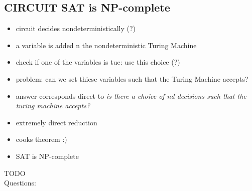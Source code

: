 \documentclass[a4]{scrartcl}
\begin{document}
\subsection*{\textsc{CIRCUIT SAT} is \textsc{NP}-complete}

\begin{itemize}
\item circuit decides nondeterministically (?)
\item a variable is added n the nondeterministic Turing Machine
\item check if one of the variables is tue: use this choice (?)
\item problem: can we set thiese variables such that the Turing Machine accepts?
\item answer corresponds direct to \textit{is there a choice of nd decisions such that the turing machine accepts?}
\item extremely direct reduction
\item cooks theorem :) 
\item \textsc{SAT} is \textsc{NP}-complete
\end{itemize}




\color{red} TODO \\
\color{violet} Questions:
\color{black}


\newpage

\printbibliography
\end{document}
